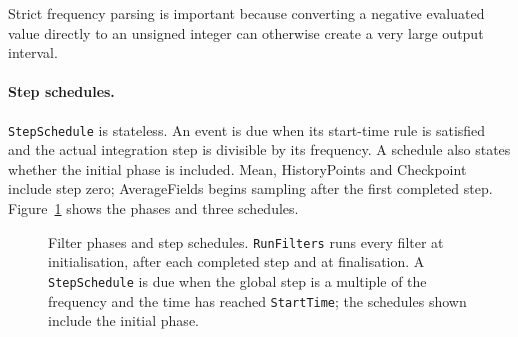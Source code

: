Strict frequency parsing is important because converting a negative evaluated
value directly to an unsigned integer can otherwise create a very large output
interval.

\paragraph{Step schedules.}
\texttt{StepSchedule} is stateless. An event is due when its start-time rule is
satisfied and the actual integration step is divisible by its frequency. A
schedule also states whether the initial phase is included. Mean,
HistoryPoints and Checkpoint include step zero; AverageFields begins sampling
after the first completed step.
Figure~\ref{fig:solvercore-filters-schedule} shows the phases and three
schedules.

\begin{figure}[htbp]
\centering
{}
\caption{Filter phases and step schedules. \texttt{RunFilters} runs every
filter at initialisation, after each completed step and at finalisation. A
\texttt{StepSchedule} is due when the global step is a multiple of the
frequency and the time has reached \texttt{StartTime}; the schedules shown
include the initial phase.}
\label{fig:solvercore-filters-schedule}
\end{figure}



